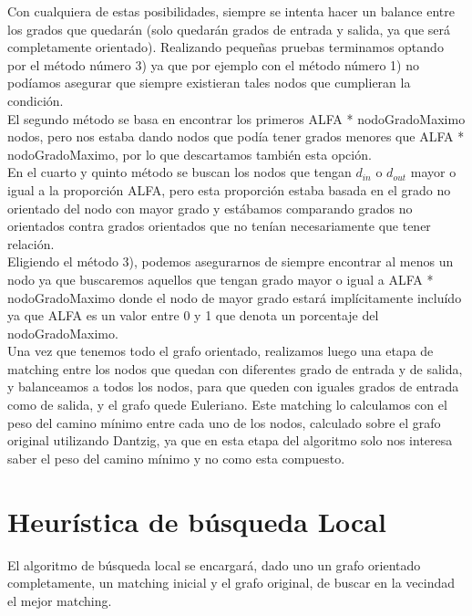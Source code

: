 \documentclass[11pt, a4paper, spanish]{article}
\begin{document}
Con cualquiera de estas posibilidades, siempre se intenta hacer un balance entre los grados que quedar\'an (solo quedar\'an grados de entrada y salida, ya que ser\'a completamente orientado). Realizando peque\~{n}as pruebas terminamos optando por el m\'etodo n\'umero 3) ya que por ejemplo con el m\'etodo n\'umero 1) no pod\'iamos asegurar que siempre existieran tales nodos que cumplieran la condici\'on.\\

El segundo m\'etodo se basa en encontrar los primeros ALFA * nodoGradoMaximo nodos, pero nos estaba dando nodos que pod\'ia tener grados menores que ALFA * nodoGradoMaximo, por lo que descartamos tambi\'en esta opci\'on.\\

En el cuarto y quinto m\'etodo se buscan los nodos que tengan $d_{in}$ o $d_{out}$ mayor o igual a la proporci\'on ALFA, pero esta proporci\'on estaba basada en el grado no orientado del nodo con mayor grado y est\'abamos comparando grados no orientados contra grados orientados que no ten\'ian necesariamente que tener relaci\'on.\\

Eligiendo el m\'etodo 3), podemos asegurarnos de siempre encontrar al menos un nodo ya que buscaremos aquellos que tengan grado mayor o igual a ALFA * nodoGradoMaximo donde el nodo de mayor grado estar\'a impl\'icitamente inclu\'ido ya que ALFA es un valor entre 0 y 1 que denota un porcentaje del nodoGradoMaximo.\\

Una vez que tenemos todo el grafo orientado, realizamos luego una etapa de matching entre los nodos que quedan con diferentes grado de entrada y de salida, y balanceamos a todos los nodos, para que queden con iguales grados de entrada como de salida, y el grafo quede Euleriano. Este matching lo calculamos con el peso del camino m\'inimo entre cada uno de los nodos, calculado sobre el grafo original utilizando Dantzig, ya que en esta etapa del algoritmo solo nos interesa saber el peso del camino m\'inimo y no como esta compuesto.\\


\newpage	
\section{Heur\'istica de b\'usqueda Local}

	El algoritmo de b\'usqueda local se encargar\'a, dado uno un grafo orientado completamente, un matching inicial y el grafo original, de buscar en la vecindad el mejor matching.\\
\end{document}
